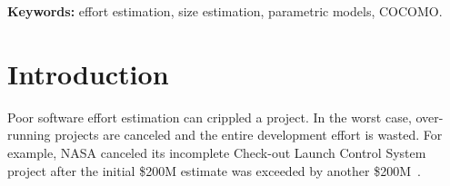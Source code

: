 \documentclass[final,twocolumn]{elsarticle}
\theoremstyle{break}
\begin{document}

 
\vspace{1mm}
\noindent
{\bf Keywords:} effort estimation, size estimation, parametric models, COCOMO.

\section{Introduction}
Poor software effort estimation can crippled a project.
In
the worst case, over-running projects are canceled and
the entire development effort is wasted. For example,
NASA canceled its incomplete Check-out Launch Control
System project after the initial \$200M estimate was
exceeded by another \$200M~\cite{clcs03}.
\end{document}
